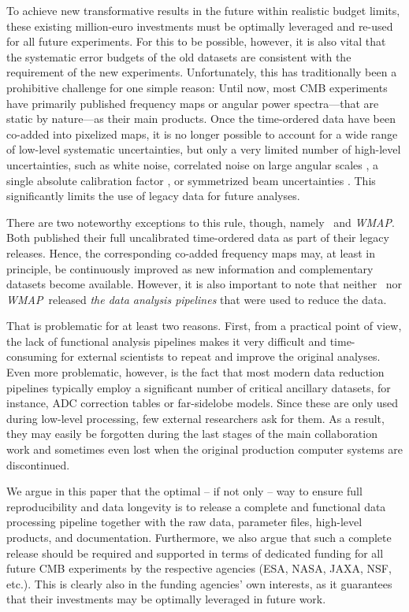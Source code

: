 \documentclass[twocolumn]{openjournal}
\def\WMAP{\textit{WMAP}}
\begin{document}
To achieve new transformative results in the future within realistic budget
limits, these existing million-euro investments must be optimally leveraged and
re-used for all future experiments. For this to be possible, however, it is
also vital that the systematic error budgets of the old datasets are consistent
with the requirement of the new experiments. Unfortunately, this has
traditionally been a prohibitive challenge for one simple reason: Until now,
most CMB experiments have primarily published frequency maps or angular power
spectra---that are static by nature---as their main products. Once the
time-ordered data have been co-added into pixelized maps, it is no longer
possible to account for a wide range of low-level systematic uncertainties, but
only a very limited number of high-level uncertainties, such as white noise,
correlated noise on large angular scales \citep{bennett2012,bp10}, a single
absolute calibration factor \citep{planck2014-a10,bp07}, or symmetrized beam
uncertainties \citep{planck2016-l05}. This significantly limits the use of
legacy data for future analyses.

There are two noteworthy exceptions to this rule, though, namely \Planck\ and
\WMAP. Both published their full uncalibrated time-ordered data as part of
their legacy releases. Hence, the corresponding co-added frequency maps may, at
least in principle, be continuously improved as new information and
complementary datasets become available. However, it is also important to note
that neither \Planck\ nor \WMAP\ released \emph{the data analysis pipelines}
that were used to reduce the data.

That is problematic for at least two reasons. First, from a practical point of
view, the lack of functional analysis pipelines makes it very difficult and
time-consuming for external scientists to repeat and improve the original
analyses. Even more problematic, however, is the fact that most modern data
reduction pipelines typically employ a significant number of critical ancillary
datasets, for instance, ADC correction tables or far-sidelobe models. Since
these are only used during low-level processing, few external researchers ask
for them. As a result, they may easily be forgotten during the last stages of
the main collaboration work and sometimes even lost when the original
production computer systems are discontinued.

We argue in this paper that the optimal -- if not only -- way to ensure full
reproducibility and data longevity is to release a complete and functional data
processing pipeline together with the raw data, parameter files, high-level
products, and documentation. Furthermore, we also argue that such a complete
release should be required and supported in terms of dedicated funding for all
future CMB experiments by the respective agencies (ESA, NASA, JAXA, NSF, etc.).
This is clearly also in the funding agencies' own interests, as it guarantees
that their investments may be optimally leveraged in future work.
\end{document}
